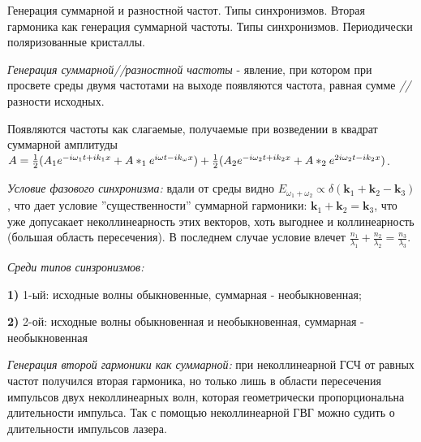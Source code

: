 
\begin{leftrules}
Генерация суммарной и разностной частот. Типы синхронизмов. Вторая гармоника как генерация суммарной частоты. Типы синхронизмов. Периодически поляризованные кристаллы.
\end{leftrules}





\begin{to_def}
    \textit{Генерация суммарной//разностной частоты} - явление, при котором при просвете среды двумя частотами на выходе появляются частота, равная сумме \textit{//} разности исходных.
\end{to_def}

Появляются частоты как слагаемые, получаемые при возведении в квадрат суммарной амплитуды $A = \frac{1}{2} (A_{1}e^{-i\omega_{1} t +i k_{1}x} + A*_{1}e^{i\omega t -i k_{\omega}x}) + \\ \frac{1}{2} (A_{2}e^{-i\omega_{2} t +i k_{2}x} + A*_{2}e^{2i\omega_{2} t -i k_{2}x})$.


\textit{Условие фазового синхронизма:} вдали от среды видно $E_{\omega_{1}+\omega_{2}} \propto \delta(\mathbf{k}_{1}+\mathbf{k}_{2}-\mathbf{k}_{3})$, что дает условие ''существенности'' суммарной гармоники: $\mathbf{k}_{1}+\mathbf{k}_{2}=\mathbf{k}_{3}$, что уже допусакает неколлинеарность этих векторов, хоть выгоднее и коллинеарность (большая область пересечения). В последнем случае условие влечет $\frac{n_{1}}{\lambda_{1}}+\frac{n_{2}}{\lambda_{2}}=\frac{n_{3}}{\lambda_{3}}$.


\textit{Среди типов синзронизмов:} \\
    \par \textbf{1)} 1-ый: исходные волны обыкновенные, суммарная - необыкновенная;\\
    \par \textbf{2)} 2-ой: исходные волны обыкновенная и необыкновенная, суммарная - необыкновенная


\textit{Генерация второй гармоники как суммарной:} при неколлинеарной ГСЧ от равных частот получился вторая гармоника, но только лишь в области пересечения импульсов двух неколлинеарных волн, которая геометрически пропорциональна длительности импульса. Так с помощью неколлинеарной ГВГ можно судить о длительности импульсов лазера.